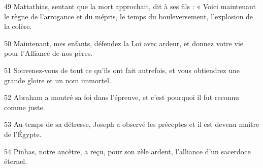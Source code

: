 
49 Mattathias, sentant que la mort approchait, dit à ses fils : « Voici maintenant le règne de l’arrogance et du mépris, le temps du bouleversement, l’explosion de la colère.

50 Maintenant, mes enfants, défendez la Loi avec ardeur, et donnez votre vie pour l’Alliance de nos pères.

51 Souvenez-vous de tout ce qu’ils ont fait autrefois, et vous obtiendrez une grande gloire et un nom immortel.

52 Abraham a montré sa foi dans l’épreuve, et c’est pourquoi il fut reconnu comme juste.

53 Au temps de sa détresse, Joseph a observé les préceptes et il est devenu maître de l’Égypte.

54 Pinhas, notre ancêtre, a reçu, pour son zèle ardent, l’alliance d’un sacerdoce éternel.
